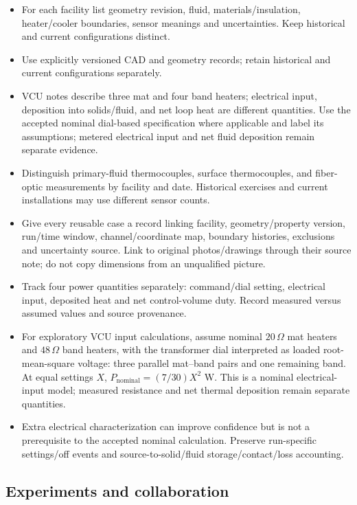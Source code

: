 \begin{itemize}[leftmargin=*]
\item For each facility list geometry revision, fluid, materials/\allowbreak{}insulation, heater/\allowbreak{}cooler boundaries, sensor meanings and uncertainties. Keep historical and current configurations distinct.
\item Use explicitly versioned CAD and geometry records; retain historical and current configurations separately.
\item VCU notes describe three mat and four band heaters; electrical input, deposition into solids/\allowbreak{}fluid, and net loop heat are different quantities. Use the accepted nominal dial-based specification where applicable and label its assumptions; metered electrical input and net fluid deposition remain separate evidence.
\item Distinguish primary-fluid thermocouples, surface thermocouples, and fiber-optic measurements by facility and date. Historical exercises and current installations may use different sensor counts.
\item Give every reusable case a record linking facility, geometry/\allowbreak{}property version, run/\allowbreak{}time window, channel/\allowbreak{}coordinate map, boundary histories, exclusions and uncertainty source. Link to original photos/\allowbreak{}drawings through their source note; do not copy dimensions from an unqualified picture.
\item Track four power quantities separately: command/\allowbreak{}dial setting, electrical input, deposited heat and net control-volume duty. Record measured versus assumed values and source provenance.\cite{jcgm2020measurementmodels}
\item For exploratory VCU input calculations, assume nominal $20\,\Omega$ mat heaters and $48\,\Omega$ band heaters, with the transformer dial interpreted as loaded root-mean-square voltage: three parallel mat--band pairs and one remaining band. At equal settings $X$, $P_{\mathrm{nominal}}=(7/30)X^2$ W. This is a nominal electrical-input model; measured resistance and net thermal deposition remain separate quantities.
\item Extra electrical characterization can improve confidence but is not a prerequisite to the accepted nominal calculation. Preserve run-specific settings/\allowbreak{}off events and source-to-solid/\allowbreak{}fluid storage/\allowbreak{}contact/\allowbreak{}loss accounting.
\end{itemize}

\subsection{Experiments and collaboration}\label{subsec:experiments-and-collaboration}

